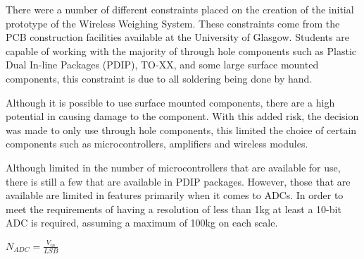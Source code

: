 There were a number of different constraints placed on the creation of the initial prototype of the Wireless Weighing System. These constraints come from the PCB construction facilities available at the University of Glasgow. Students are capable of working with the majority of through hole components such as Plastic Dual In-line Packages (PDIP), TO-XX, and some large surface mounted components, this constraint is due to all soldering being done by hand.

Although it is possible to use surface mounted components, there are a high potential in causing damage to the component. With this added risk, the decision was made to only use through hole components, this limited the choice of certain components such as microcontrollers, amplifiers and wireless modules.

Although limited in the number of microcontrollers that are available for use, there is still a few that are available in PDIP packages. However, those that are available are limited in features primarily when it comes to ADCs. In order to meet the requirements of having a resolution of less than 1kg at least a 10-bit ADC is required, assuming a maximum of 100kg on each scale.

\begin{center}
$N_{ADC} = \frac{V_{in}}{LSB}$
\end{center}